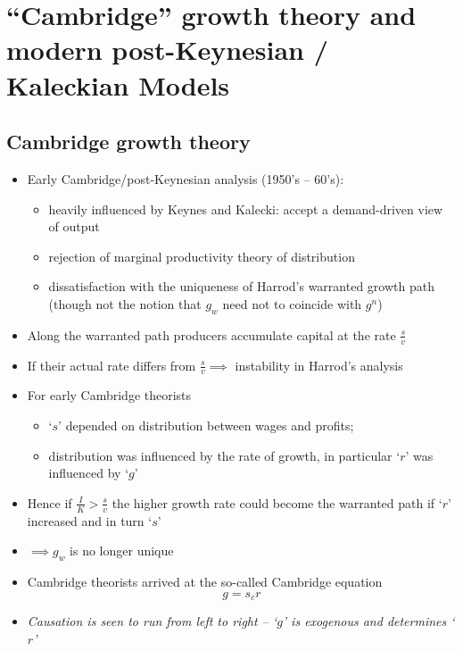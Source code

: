 \documentclass{article}
\begin{document}
\section{``Cambridge'' growth theory and modern post-Keynesian / Kaleckian Models}
\subsection{Cambridge growth theory}
	\begin{itemize}
		\item Early Cambridge/post-Keynesian analysis (1950's -- 60's):
		\begin{itemize}
			\item heavily influenced by Keynes and Kalecki: accept a demand-driven view of output
			\item rejection of marginal productivity theory of distribution
			\item dissatisfaction with the uniqueness of Harrod's warranted growth path (though not the notion that \( g_w \) need not to coincide with \( g^n \))
		\end{itemize}
	   \item Along the warranted path producers accumulate capital at the rate \( \frac{s}{v} \)
	   \item If their actual rate differs from \( \frac{s}{v} \implies \) instability in Harrod's analysis
	   \item For early Cambridge theorists 
	   \begin{itemize}
		\item `\( s \)' depended on distribution between wages and profits; 
		\item distribution was influenced by the rate of growth, in particular `\( r \)' was influenced by `\( g \)'
	   \end{itemize}
	   \item Hence if \( \frac{I}{K} > \frac{s}{v} \) the higher growth rate could become the warranted path if `\( r \)' increased and in turn `\( s \)'
	   \item \( \implies g_w \) is no longer unique
	   \item  Cambridge theorists arrived at the so-called Cambridge equation
	   \begin{equation}
			g = s_c r \label{eq:7.1}
	   \end{equation}
	   \item \textit{Causation is seen to run from left to right -- `\( g \)' is exogenous and determines `\( r \)'} 
	\end{itemize}
\end{document}
